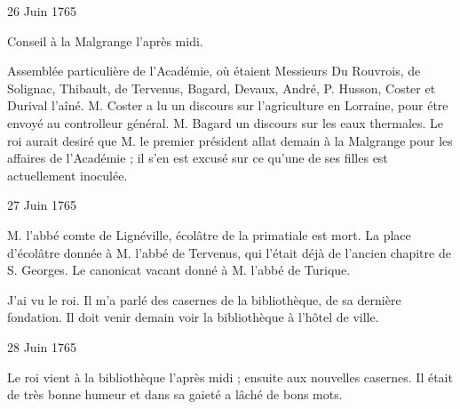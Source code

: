                      \begin{diary}{26 Juin 1765}{}

                         Conseil à la Malgrange l'après midi. \bigskip


                         Assemblée particulière de l'Académie, où étaient
                           Messieurs
                           Du Rouvrois, de Solignac, Thibault, de
                           Tervenus,
                           Bagard, Devaux,
                              André, P.
                              Husson, Coster et Durival l'aîné. M.
                              Coster a lu un discours
                              sur l'agriculture en Lorraine, pour étre envoyé
                           au controlleur
                              général. M. Bagard
                           un discours
                              sur les eaux thermales. Le roi aurait desiré
                           que M. le premier président allat demain à la Malgrange
                           pour les affaires de l'Académie ; il s'en est excusé
                           sur ce qu'une de ses filles est actuellement inoculée. \bigskip


                     \end{diary}

                     \begin{diary}{27 Juin 1765}{}


                           M. l'abbé
                            comte de Lignéville,
                           écolâtre de la
                              primatiale est
                              mort. La place
                           d'écolâtre donnée à M. l'abbé de
                              Tervenus, qui
                           l'était déjà de l'ancien chapitre
                              de S. Georges.
                           Le canonicat vacant donné
                           à M. l'abbé de
                              Turique. \bigskip


                         J'ai vu le roi. Il m'a parlé des casernes
                           de la bibliothèque, de sa dernière fondation. Il
                           doit venir demain voir la bibliothèque à
                              l'hôtel de ville. \bigskip


                     \end{diary}

                     \begin{diary}{28 Juin 1765}{}


                           Le roi vient à la bibliothèque l'après midi ; ensuite
                           aux nouvelles casernes. Il était de très bonne
                           humeur et dans sa gaieté a lâché de bons mots. \bigskip


                     \end{diary}

